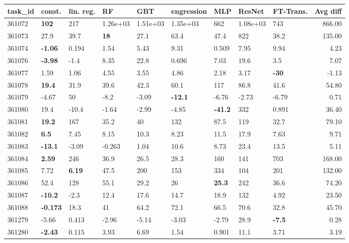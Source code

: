 \begin{table}[ht!]
\centering
\begingroup\footnotesize
\begin{tabular}{lllllllllr}
  \hline
\hline
task\_id & const. & lin. reg. & RF & GBT & engression & MLP & ResNet & FT-Trans. & Avg diff \\ 
  \hline
361072 & \textbf{102} & 217 & 1.26e+03 & 1.51e+03 & 1.35e+03 & 662 & 1.08e+03 & 743 & 866.00 \\ 
  361073 & 27.9 & 39.7 & \textbf{18} & 27.1 & 63.4 & 47.4 & 822 & 38.2 & 135.00 \\ 
  361074 & \textbf{-1.06} & 0.194 & 1.54 & 5.43 & 9.31 & 0.509 & 7.95 & 9.94 & 4.23 \\ 
  361076 & \textbf{-3.98} & -1.4 & 8.35 & 22.8 & 0.696 & 7.03 & 19.6 & 3.5 & 7.07 \\ 
  361077 & 1.59 & 1.06 & 4.55 & 3.55 & 4.86 & 2.18 & 3.17 & \textbf{-30} & -1.13 \\ 
  361078 & \textbf{19.4} & 31.9 & 39.6 & 42.3 & 60.1 & 117 & 86.8 & 41.6 & 54.80 \\ 
  361079 & -4.67 & 50 & -8.2 & -3.09 & \textbf{-12.1} & -6.76 & -2.73 & -6.79 & 0.71 \\ 
  361080 & 19.4 & -10.4 & -1.64 & -2.99 & -4.85 & \textbf{-41.2} & 332 & 0.891 & 36.40 \\ 
  361081 & \textbf{19.2} & 167 & 35.2 & 40 & 132 & 87.5 & 119 & 32.7 & 79.10 \\ 
  361082 & \textbf{6.5} & 7.45 & 8.15 & 10.3 & 8.23 & 11.5 & 17.9 & 7.63 & 9.71 \\ 
  361083 & \textbf{-13.1} & -3.09 & -0.263 & 1.04 & 10.6 & 8.73 & 23.4 & 13.5 & 5.11 \\ 
  361084 & \textbf{2.59} & 246 & 36.9 & 26.5 & 28.3 & 160 & 141 & 703 & 168.00 \\ 
  361085 & 7.72 & \textbf{6.19} & 47.5 & 200 & 153 & 334 & 104 & 201 & 132.00 \\ 
  361086 & 52.4 & 128 & 55.1 & 29.2 & 26 & \textbf{25.3} & 242 & 36.6 & 74.20 \\ 
  361087 & \textbf{-10.2} & -2.3 & 12.4 & 17.6 & 14.7 & 18.9 & 132 & 4.92 & 23.50 \\ 
  361088 & \textbf{-0.173} & 18.3 & 41 & 64.2 & 72.1 & 66.5 & 70.6 & 32.8 & 45.70 \\ 
  361279 & -5.66 & 0.413 & -2.96 & -5.14 & -3.03 & -2.79 & 28.9 & \textbf{-7.5} & 0.28 \\ 
  361280 & \textbf{-2.43} & 0.115 & 3.93 & 6.69 & 1.54 & 0.901 & 11.1 & 3.71 & 3.19 \\ 

\end{tabular}
\end{table}
